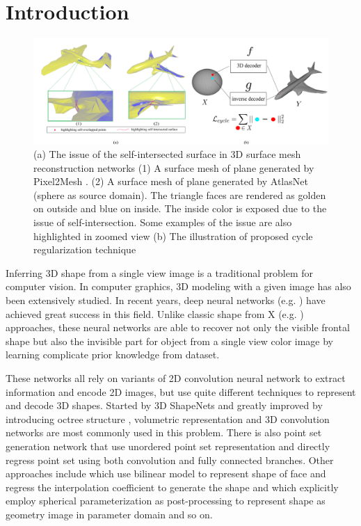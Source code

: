 \section{Introduction}
\begin{figure}[htbp]
	\centering
	\includegraphics[width=\linewidth]{img/issue/issue}
	\caption{(a) The issue of the self-intersected surface in 3D surface mesh reconstruction networks (1) A surface mesh of plane generated by Pixel2Mesh \cite{pixel2mesh}. (2) A surface mesh of plane generated by AtlasNet \cite{atlasnet}(sphere as source domain). The triangle faces are rendered as golden on outside and blue on inside. The inside color is exposed due to the issue of self-intersection. Some examples of the issue are also highlighted in zoomed view
	(b) The illustration of proposed cycle regularization technique}
	\label{fig:issue}
\end{figure}
Inferring 3D shape from a single view image is a traditional problem for computer vision. In computer graphics, 3D modeling with a given image has also been extensively studied. In recent years, deep neural networks (e.g. \cite{3DR2N2,PSGN,3Drender,imgrecon15,3dshapenet,endface,octreegen,surfnet,shapeprior}) have achieved great success in this field. Unlike classic shape from X (e.g. \cite{shapefromshading,shapefromtext1,shapefromtext2}) approaches, these neural networks are able to recover not only the visible frontal shape but also the invisible part for object from a single view color image by learning complicate prior knowledge from dataset. 

These networks all rely on variants of 2D convolution neural network to extract information and encode 2D images, but use quite different techniques to represent and decode 3D shapes. Started by 3D ShapeNets \cite{3dshapenet} and greatly improved by introducing octree structure \cite{octreegen}, volumetric representation and 3D convolution networks are most commonly used in this problem. There is also point set generation network \cite{PSGN} that use unordered point set representation and directly regress point set using both convolution and fully connected branches. Other approaches include \cite{endface} which use bilinear model to represent shape of face and regress the interpolation coefficient to generate the shape and \cite{surfnet} which explicitly employ spherical parameterization as post-processing to represent shape as geometry image in parameter domain and so on.

